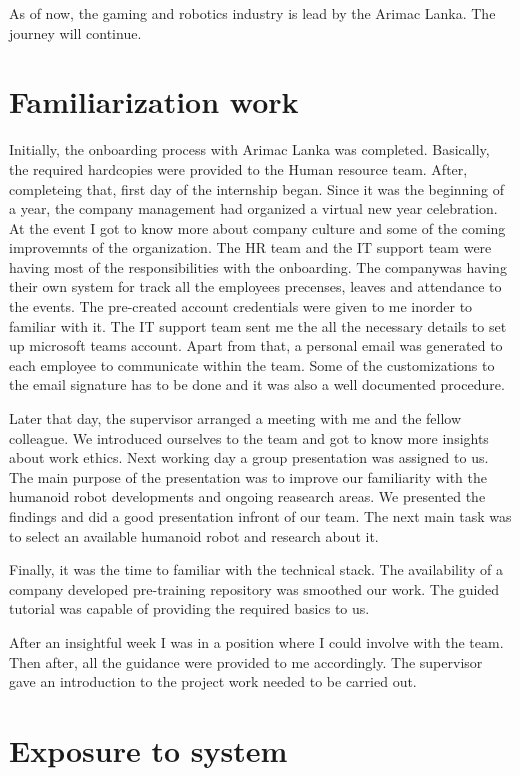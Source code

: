 \documentclass[twoside,12pt,times,onecolumn,a4paper]{report}
\begin{document}
As of now, the gaming and robotics industry is lead by the Arimac Lanka. The journey will continue. 

\chapter{Familiarization work}

\hspace{3em} Initially, the onboarding process with Arimac Lanka was completed. Basically, the required hardcopies were provided to the Human resource team. After, completeing that, first day of the internship began. Since it was the beginning of a year, the company management had organized a virtual new year celebration. At the event I got to know more about company culture and some of the coming improvemnts of the organization. The HR team and the IT support team were having most of the responsibilities with the onboarding. The companywas having their own system for track all the employees precenses, leaves and attendance to the events. The pre-created account credentials were given to me inorder to familiar with it. The IT support team sent me the all the necessary details to set up microsoft teams account. Apart from that, a personal email was generated to each employee to communicate within the team. Some of the customizations to the email signature has to be done and it was also a well documented procedure.

Later that day, the supervisor arranged a meeting with me and the fellow colleague. We introduced ourselves to the team and got to know more insights about work ethics. Next working day a group presentation was assigned to us. The main purpose of the presentation was to improve our familiarity with the humanoid robot developments and ongoing reasearch areas. We presented the findings and did a good presentation infront of our team. The next main task was to select an available humanoid robot and research about it. 

Finally, it was the time to familiar with the technical stack. The availability of a company developed pre-training repository was smoothed our work. The guided tutorial was capable of providing the required basics to us. 

After an insightful week I was in a position where I could involve with the team. Then after, all the guidance were provided to me accordingly. The supervisor gave an introduction to the project work needed to be carried out. 


\chapter{Exposure to system}
\end{document}
